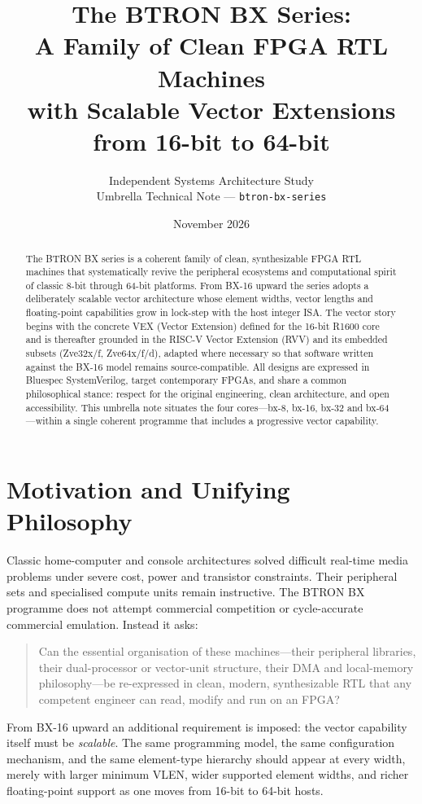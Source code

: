 \documentclass[11pt,a4paper]{article}
\title{\textbf{The BTRON BX Series:\\
A Family of Clean FPGA RTL Machines\\
with Scalable Vector Extensions\\
from 16-bit to 64-bit}}
\author{
  Independent Systems Architecture Study\\
  Umbrella Technical Note --- \texttt{btron-bx-series}
}
\date{November 2026}
\begin{document}
\maketitle

\begin{abstract}
The BTRON BX series is a coherent family of clean, synthesizable FPGA RTL machines that systematically revive the peripheral ecosystems and computational spirit of classic 8-bit through 64-bit platforms. From BX-16 upward the series adopts a deliberately scalable vector architecture whose element widths, vector lengths and floating-point capabilities grow in lock-step with the host integer ISA. The vector story begins with the concrete VEX (Vector Extension) defined for the 16-bit R1600 core and is thereafter grounded in the RISC-V Vector Extension (RVV) and its embedded subsets (Zve32x/f, Zve64x/f/d), adapted where necessary so that software written against the BX-16 model remains source-compatible. All designs are expressed in Bluespec SystemVerilog, target contemporary FPGAs, and share a common philosophical stance: respect for the original engineering, clean architecture, and open accessibility. This umbrella note situates the four cores---bx-8, bx-16, bx-32 and bx-64---within a single coherent programme that includes a progressive vector capability.
\end{abstract}

\section{Motivation and Unifying Philosophy}

Classic home-computer and console architectures solved difficult real-time media problems under severe cost, power and transistor constraints. Their peripheral sets and specialised compute units remain instructive. The BTRON BX programme does not attempt commercial competition or cycle-accurate commercial emulation. Instead it asks:

\begin{quote}
Can the essential organisation of these machines---their peripheral libraries, their dual-processor or vector-unit structure, their DMA and local-memory philosophy---be re-expressed in clean, modern, synthesizable RTL that any competent engineer can read, modify and run on an FPGA?
\end{quote}

From BX-16 upward an additional requirement is imposed: the vector capability itself must be \emph{scalable}. The same programming model, the same configuration mechanism, and the same element-type hierarchy should appear at every width, merely with larger minimum VLEN, wider supported element widths, and richer floating-point support as one moves from 16-bit to 64-bit hosts.
\end{document}
